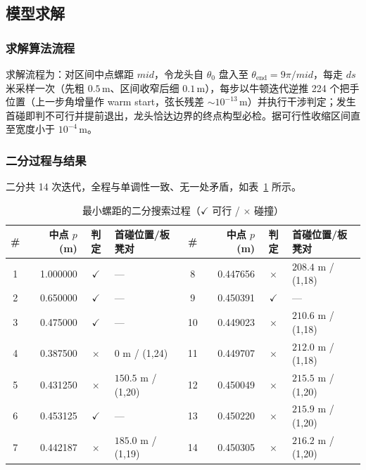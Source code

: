 ﻿\documentclass{cumcmthesis}
\begin{document}
\subsection{模型求解}

\subsubsection{求解算法流程}
求解流程为：对区间中点螺距 $mid$，令龙头自 $\theta_0$ 盘入至 $\theta_{\mathrm{end}}=9\pi/mid$，每走 $ds$ 米采样一次（先粗 $0.5\,\text{m}$、区间收窄后细 $0.1\,\text{m}$），每步以牛顿迭代逆推 224 个把手位置（上一步角增量作 warm start，弦长残差 $\sim10^{-13}\,\text{m}$）并执行干涉判定；发生首碰即判不可行并提前退出，龙头恰达边界的终点构型必检。据可行性收缩区间直至宽度小于 $10^{-4}\,\text{m}$。

\subsubsection{二分过程与结果}
二分共 14 次迭代，全程与单调性一致、无一处矛盾，如表~\ref{tab:p3bis} 所示。

\begin{table}[H]
\centering
\caption{最小螺距的二分搜索过程（$\checkmark$ 可行 / $\times$ 碰撞）}
\label{tab:p3bis}
\footnotesize\setlength{\tabcolsep}{5pt}
\renewcommand{\arraystretch}{1.12}
\begin{tabular}{crclcrcl}
\toprule
\# & 中点 $p$ (m) & 判定 & 首碰位置/板凳对 & \# & 中点 $p$ (m) & 判定 & 首碰位置/板凳对 \\
\midrule
1 & 1.000000 & $\checkmark$ & — & 8 & 0.447656 & $\times$ & $208.4$ m / (1,18) \\
2 & 0.650000 & $\checkmark$ & — & 9 & 0.450391 & $\checkmark$ & — \\
3 & 0.475000 & $\checkmark$ & — & 10 & 0.449023 & $\times$ & $210.6$ m / (1,18) \\
4 & 0.387500 & $\times$ & $0$ m / (1,24) & 11 & 0.449707 & $\times$ & $212.0$ m / (1,18) \\
5 & 0.431250 & $\times$ & $150.5$ m / (1,20) & 12 & 0.450049 & $\times$ & $215.5$ m / (1,20) \\
6 & 0.453125 & $\checkmark$ & — & 13 & 0.450220 & $\times$ & $215.9$ m / (1,20) \\
7 & 0.442187 & $\times$ & $185.0$ m / (1,19) & 14 & 0.450305 & $\times$ & $216.2$ m / (1,20) \\
\bottomrule
\end{tabular}
\end{table}
\end{document}
